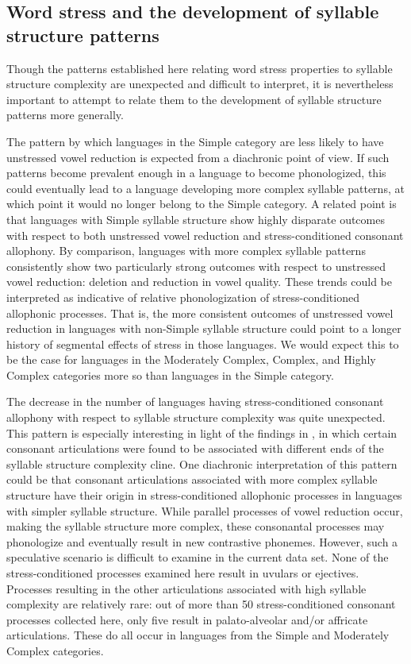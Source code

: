\subsection{Word stress and the development of syllable structure patterns}\label{sec:5.5.2}

  Though the patterns established here relating word stress properties to syllable structure complexity are unexpected and difficult to interpret, it is nevertheless important to attempt to relate them to the development of syllable structure patterns more generally.

  The pattern by which languages in the Simple category are less likely to have unstressed vowel reduction is expected from a diachronic point of view. If such patterns become prevalent enough in a language to become phonologized, this could eventually lead to a language developing more complex syllable patterns, at which point it would no longer belong to the Simple category. A related point is that languages with Simple syllable structure show highly disparate outcomes with respect to both unstressed vowel reduction and stress-conditioned consonant allophony. By comparison, languages with more complex syllable patterns consistently show two particularly strong outcomes with respect to unstressed vowel reduction: deletion and reduction in vowel quality. These trends could be interpreted as indicative of relative phonologization of stress-conditioned allophonic processes. That is, the more consistent outcomes of unstressed vowel reduction in languages with non-Simple syllable structure could point to a longer history of segmental effects of stress in those languages. We would expect this to be the case for languages in the Moderately Complex, Complex, and Highly Complex categories more so than languages in the Simple category. 

  The decrease in the number of languages having stress-conditioned consonant allophony with respect to syllable structure complexity was quite unexpected. This pattern is especially interesting in light of the findings in , in which certain consonant articulations were found to be associated with different ends of the syllable structure complexity cline. One diachronic interpretation of this pattern could be that consonant articulations associated with more complex syllable structure have their origin in stress-conditioned allophonic processes in languages with simpler syllable structure. While parallel processes of vowel reduction occur, making the syllable structure more complex, these consonantal processes may phonologize and eventually result in new contrastive phonemes. However, such a speculative scenario is difficult to examine in the current data set. None of the stress-conditioned processes examined here result in uvulars or ejectives. Processes resulting in the other articulations associated with high syllable complexity are relatively rare: out of more than 50 stress-conditioned consonant processes collected here, only five result in palato-alveolar and/or affricate articulations. These do all occur in languages from the Simple and Moderately Complex categories.

